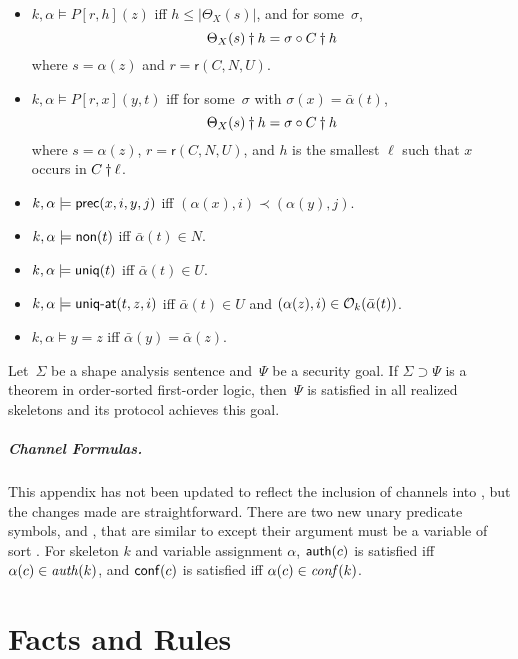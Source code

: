 \documentclass[12pt]{report}
\theoremstyle{definition}
\newcommand{\auth}{\fn{auth}}
\newcommand{\conf}{\fn{conf}}
\newcommand{\role}{\mathsf{r}}
\begin{document}
\begin{itemize}
\item $k,\alpha\models P[r,h](z)$ iff $h\leq|\Theta_X(s)|$, and for
  some~$\sigma$,
  \[\Theta_X(s)\dagger h=\sigma\circ C\dagger h\]
  where $s=\alpha(z)$ and $r=\role(C,N,U)$.

\item $k,\alpha\models P[r,x](y,t)$ iff
  for some~$\sigma$ with $\sigma(x)=\bar\alpha(t)$,
  \[\Theta_X(s)\dagger h=\sigma\circ C\dagger h\]
  where $s=\alpha(z)$, $r=\role(C,N,U)$, and $h$ is the smallest
  $\ell$ such that $x$ occurs in $C\dagger\ell$.

\item $k,\alpha\models\operatorname{\mathsf{prec}}(x,i,y,j)$ iff
  $(\alpha(x),i)\prec(\alpha(y),j)$.
\item $k,\alpha\models\operatorname{\mathsf{non}}(t)$ iff $\bar\alpha(t)\in N$.
\item $k,\alpha\models\operatorname{\mathsf{uniq}}(t)$ iff $\bar\alpha(t)\in U$.
\item $k,\alpha\models\operatorname{\mathsf{\mbox{\sf uniq-at}}}(t,z,i)$ iff $\bar\alpha(t)\in U$ and
  $(\alpha(z),i)\in\mathcal{O}_k(\bar\alpha(t))$.
\item $k,\alpha\models y=z$ iff $\bar\alpha(y)=\bar\alpha(z)$.
\end{itemize}

Let~$\Sigma$ be a shape analysis sentence and~$\Psi$ be a security
goal.  If $\Sigma\supset\Psi$ is a theorem in order-sorted first-order
logic, then~$\Psi$ is satisfied in all realized skeletons and its
protocol achieves this goal.

\paragraph{Channel Formulas.}

This appendix has not been updated to reflect the inclusion of
channels into {\cpsa}, but the changes made are straightforward.
There are two new unary predicate symbols,  and , that
are similar to  except their argument must be a variable of sort
.  For skeleton $k$ and variable assignment $\alpha$,
$\operatorname{\mathsf{auth}}(c)$ is satisfied iff $\alpha(c)\in\auth(k)$, and
$\operatorname{\mathsf{conf}}(c)$ is satisfied iff $\alpha(c)\in\conf(k)$.

\chapter{Facts and Rules}\label{chp:facts and rules}
\end{document}

